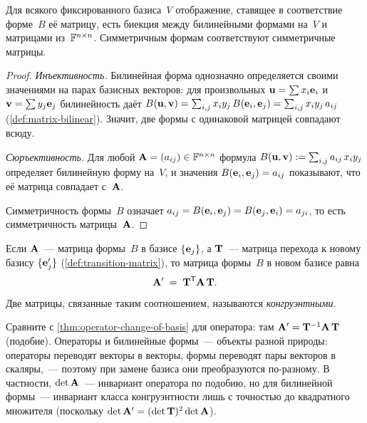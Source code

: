 \begin{theorem}
\label{thm:bilinear-matrix-bijection}
Для всякого фиксированного базиса~$V$ отображение, ставящее в
соответствие форме~$B$ её матрицу, есть биекция между билинейными
формами на~$V$ и матрицами из~$\mathbb{F}^{n \times n}$. Симметричным формам
соответствуют симметричные матрицы.
\end{theorem}
\begin{proof}
\emph{Инъективность.} Билинейная форма однозначно определяется своими
значениями на парах базисных векторов: для произвольных
$\mathbf{u} = \sum x_i \mathbf{e}_i$ и $\mathbf{v} = \sum y_j \mathbf{e}_j$
билинейность даёт
$B(\mathbf{u}, \mathbf{v}) = \sum_{i, j} x_i y_j\, B(\mathbf{e}_i, \mathbf{e}_j)
= \sum_{i, j} x_i y_j\, a_{ij}$
(\cref{def:matrix-bilinear}). Значит, две формы с одинаковой матрицей
совпадают всюду.

\emph{Сюръективность.} Для любой $\mathbf{A} = (a_{ij}) \in \mathbb{F}^{n \times n}$
формула
$B(\mathbf{u}, \mathbf{v}) := \sum_{i, j} a_{ij}\, x_i y_j$
определяет билинейную форму на~$V$, и значения $B(\mathbf{e}_i, \mathbf{e}_j) = a_{ij}$
показывают, что её матрица совпадает с~$\mathbf{A}$.

Симметричность формы~$B$ означает $a_{ij} = B(\mathbf{e}_i, \mathbf{e}_j) = B(\mathbf{e}_j, \mathbf{e}_i) = a_{ji}$,
то есть симметричность матрицы~$\mathbf{A}$.
\end{proof}

\begin{theorem}
\label{thm:bilinear-change-of-basis}
Если $\mathbf{A}$~--- матрица формы~$B$ в базисе $\{\mathbf{e}_j\}$, а
$\mathbf{T}$~--- матрица перехода к новому базису $\{\mathbf{e}'_j\}$
(\cref{def:transition-matrix}), то матрица формы~$B$ в новом базисе
равна
\[
  \mathbf{A}' \;=\; \mathbf{T}^{\mathsf{T}} \mathbf{A}\, \mathbf{T}.
\]
Две матрицы, связанные таким соотношением, называются
\emph{конгруэнтными}.
\end{theorem}

\begin{remark}
Сравните с \cref{thm:operator-change-of-basis} для оператора: там
$\mathbf{A}' = \mathbf{T}^{-1} \mathbf{A}\, \mathbf{T}$ (подобие). Операторы и
билинейные формы~--- объекты разной природы: операторы переводят
векторы в векторы, формы переводят пары векторов в скаляры,~--- поэтому
при замене базиса они преобразуются по-разному. В частности,
$\det \mathbf{A}$~--- инвариант оператора по подобию, но для билинейной
формы~--- инвариант класса конгруэнтности лишь с точностью до
квадратного множителя (поскольку
$\det \mathbf{A}' = (\det \mathbf{T})^2 \det \mathbf{A}$).
\end{remark}

